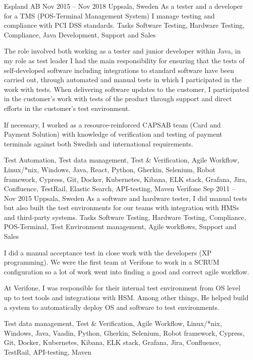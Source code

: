 \documentclass{sobCV}[2015/09/08]
\begin{document}
{Espland AB}
{Nov 2015 -- Nov 2018}
{Uppsala, Sweden}{
	As a tester and a developer for a TMS (POS-Terminal Management System) I
	manage testing and compliance with PCI DSS standards.
}
{Tasks}{
	Software Testing,
	Hardware Testing,
	Compliance,
	Java Development,
	Support and Sales
}{  %
	{
		The role involved both working as a tester and junior developer within
		Java, in my role as test leader I had the main responsibility for
		ensuring that the tests of self-developed software including
		integrations to standard software have been carried out, through
		automated and manual tests in which I participated in the work with
		tests.  When delivering software updates to the customer, I
		participated in the customer's work with tests of the product through
		support and direct efforts in the customer's test environment.

		If necessary, I worked as a  resource-reinforced CAPSAB team (Card
		and Payment Solution) with knowledge of verification and testing of
		payment terminals against both Swedish and international
		requirements.
	}
}{
	Test Automation,
	Test data management,
	Test \& Verification,
	Agile Workflow,
	Linux/*nix,
	Windows,
	Java,
	React,
	Python,
	Gherkin,
	Selenium,
	Robot framework,
	Cypress,
	Git,
	Docker,
	Kubernetes,
	Kibana,
	ELK stack,
	Grafana,
	Jira,
	Confluence,
	TestRail,
	Elastic Search,
	API-testing,
	Maven
}
{Verifone}
{Sep 2011 -- Nov 2015}
{Uppsala, Sweden}{
	As a software and hardware tester, I did manual tests but also built the
	test environments for our teams with integration with HMSs and
	third-party systems.
}
{Tasks}{
	Software Testing,
	Hardware Testing,
	Compliance,
	POS-Terminal,
	Test Environment management,
	Agile workflows,
	Support and Sales
}{  %
	{
		I did a manual acceptance test in close work with the developers (XP
		programming). We were the first team at Verifone to work in a SCRUM
		configuration so a lot of work went into finding a good and correct
		agile workflow.

		At Verifone, I was responsible for their internal test environment
		from OS level up to test tools and integrations with HSM. Among other
		things, He helped build a system to automatically deploy OS and
		software to test environments.
	}
}{
	Test data management,
	Test \& Verification,
	Agile Workflow,
	Linux/*nix,
	Windows,
	Java,
	Vaadin,
	Python,
	Gherkin,
	Selenium,
	Robot framework,
	Cypress,
	Git,
	Docker,
	Kubernetes,
	Kibana,
	ELK stack,
	Grafana,
	Jira,
	Confluence,
	TestRail,
	API-testing,
	Maven
}
\end{document}
